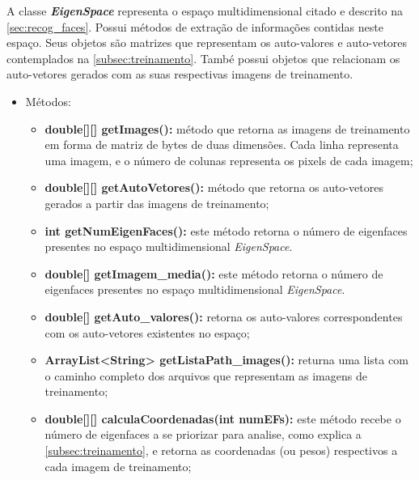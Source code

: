 
A classe \textit{\textbf{EigenSpace}} representa o espaço multidimensional citado e descrito na  \autoref{sec:recog_faces}. Possui métodos de extração de informações contidas neste espaço. Seus objetos são matrizes que representam os auto-valores e auto-vetores contemplados na \autoref{subsec:treinamento}. També possui objetos que relacionam os auto-vetores gerados com as suas respectivas imagens de treinamento.


\begin{itemize}	
	\item Métodos:
	\begin{itemize}
		\item \textbf{double[][] getImages():} método que retorna as imagens de treinamento em forma de matriz de bytes de duas dimensões. Cada linha representa uma imagem, e o número de colunas representa os pixels de cada imagem;
		
		\item \textbf{double[][] getAutoVetores():} método que retorna os auto-vetores gerados a partir das imagens de treinamento;
		
		\item \textbf{int getNumEigenFaces():} este método retorna o número de eigenfaces presentes no espaço multidimensional \textit{EigenSpace}.
		
		\item \textbf{double[] getImagem\_media():} este método retorna o número de eigenfaces presentes no espaço multidimensional \textit{EigenSpace}.
		
		\item \textbf{double[] getAuto\_valores():} retorna os auto-valores correspondentes com os auto-vetores existentes no espaço;
		
		
		\item \textbf{ArrayList<String> getListaPath\_images():} returna uma lista com o caminho completo dos arquivos que representam as imagens de treinamento;
		
		\item \textbf{double[][] calculaCoordenadas(int numEFs):} este método recebe o número de eigenfaces a se priorizar para analise, como explica a \autoref{subsec:treinamento}, e retorna as coordenadas (ou pesos) respectivos a cada imagem de treinamento;		
	
	\end{itemize}
\end{itemize}

